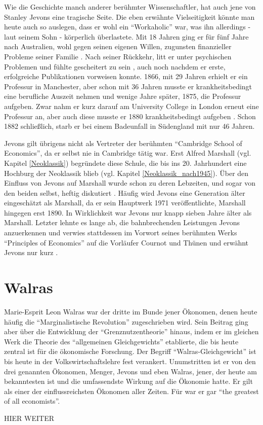 Wie die Geschichte manch anderer berühmter Wissenschaftler, hat auch jene von Stanley Jevons eine tragische Seite. Die eben erwähnte Vielseitigkeit könnte man heute auch so auslegen, dass er wohl ein "`Workaholic"' war, was ihn allerdings - laut seinem Sohn \parencite[S. 230]{Jevons1934} - körperlich überlastete. Mit 18 Jahren ging er für fünf Jahre nach Australien, wohl gegen seinen eigenen Willen, zugunsten finanzieller Probleme seiner Familie \parencite[S. 518]{Keynes1936a}. Nach seiner Rückkehr, litt er unter psychischen Problemen und fühlte gescheitert zu sein \parencite[S. 527]{Keynes1936a}, auch noch nachdem er erste, erfolgreiche Publikationen vorweisen konnte.  1866, mit 29 Jahren erhielt er ein Professur in Manchester, aber schon mit 36 Jahren musste er krankheitsbedingt eine berufliche Auszeit nehmen und wenige Jahre später, 1875, die Professur aufgeben. Zwar nahm er kurz darauf am University College in London erneut eine Professur an, aber auch diese musste er 1880 krankheitsbedingt aufgeben \parencite[S. 230]{Jevons1934}. Schon 1882 schließlich, starb er bei einem Badeunfall in Südengland mit nur 46 Jahren.

Jevons gilt übrigens nicht als Vertreter der berühmten "`Cambridge School of Economics"', da er selbst nie in Cambridge tätig war. Erst Alfred Marshall (vgl. Kapitel \ref{Neoklassik}) begründete diese Schule, die bis ins 20. Jahrhundert eine Hochburg der Neoklassik blieb (vgl. Kapitel \ref{Neoklassik_nach1945}). Über den Einfluss von Jevons auf Marshall wurde schon zu deren Lebzeiten, und sogar von den beiden selbst, heftig diskutiert \parencite[S. 536]{Keynes1936a}. Häufig wird Jevons eine Generation älter eingeschätzt als Marshall, da er sein Hauptwerk 1971 veröffentlichte, Marshall hingegen erst 1890. In Wirklichkeit war Jevons nur knapp sieben Jahre älter als Marshall. Letzter lehnte es lange ab, die bahnbrechenden Leistungen Jevons anzuerkennen \parencite[S. 535]{Keynes1936a} und verwies stattdessen im Vorwort seines berühmten Werks "`Principles of Economics"' auf die Vorläufer Cournot und Thünen und erwähnt Jevons nur kurz \parencite[S. XXII]{Marshall1890}. 


\section{Walras}
\label{Walras}

Marie-Esprit Leon Walras war der dritte im Bunde jener Ökonomen, denen heute häufig die "`Marginalistische Revolution"' zugeschrieben wird. Sein Beitrag ging aber über die Entwicklung der "`Grenznutzentheorie"' hinaus, indem er im gleichen Werk die Theorie des "`allgemeinen Gleichgewichts"' etablierte, die bis heute zentral ist für die ökonomische Forschung. Der Begriff "`Walras-Gleichgewicht"' ist bis heute in der Volkswirtschaftslehre fest verankert. Unumstritten ist er von den drei genannten Ökonomen, Menger, Jevons und eben Walras, jener, der heute am bekanntesten ist und die umfassendste Wirkung auf die Ökonomie hatte. Er gilt als einer der einflussreichsten Ökonomen aller Zeiten. Für \textcite[S. 826]{Schumpeter1954} war er gar "`the greatest of all economists"'. 

HIER WEITER

